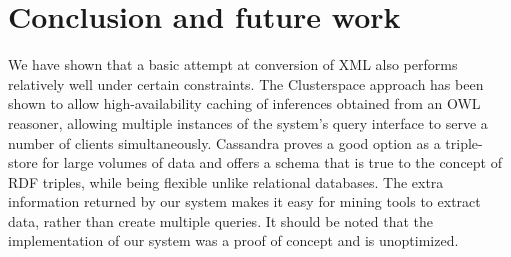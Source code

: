 \documentclass[journal]{IEEEtran}
\begin{document}
%
%
%

\section{Conclusion and future work}
We have shown that a basic attempt at conversion of XML also performs
relatively well under certain constraints. The Clusterspace approach has been
shown to allow high-availability caching of inferences obtained from an OWL
reasoner, allowing multiple instances of the system's query interface to serve
a number of clients simultaneously. Cassandra proves a good option as
a triple-store for large volumes of data and offers a schema that is true to
the concept of RDF triples, while being flexible unlike relational databases.
The extra information returned by our system makes it easy for mining tools to
extract data, rather than create multiple queries. It should be noted that the
implementation of our system was a proof of concept and is unoptimized.
\end{document}
